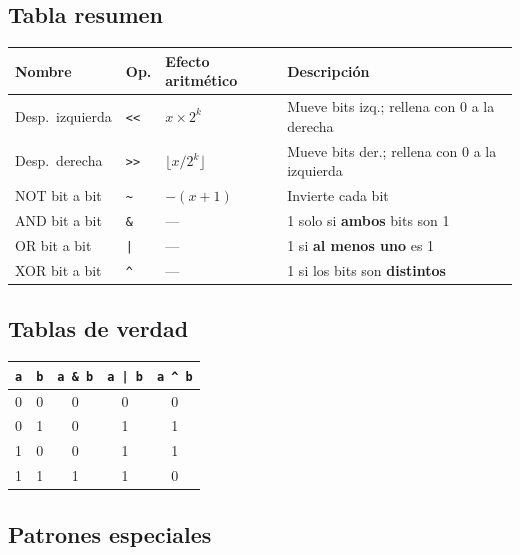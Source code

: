 \documentclass[12pt, oneside]{article}
\begin{document}
\subsection{Tabla resumen}

\begin{center}
\begin{tabular}{lllp{5.5cm}}
  \toprule
  \textbf{Nombre} & \textbf{Op.} & \textbf{Efecto aritmético} & \textbf{Descripción} \\
  \midrule
  Desp.\ izquierda & \texttt{<<} & $x \times 2^k$               & Mueve bits izq.; rellena con 0 a la derecha \\
  Desp.\ derecha   & \texttt{>>} & $\lfloor x / 2^k \rfloor$    & Mueve bits der.; rellena con 0 a la izquierda \\
  NOT bit a bit    & \texttt{\textasciitilde} & $-(x+1)$         & Invierte cada bit \\
  AND bit a bit    & \texttt{\&} & —                             & 1 solo si \textbf{ambos} bits son 1 \\
  OR bit a bit     & \texttt{|}  & —                             & 1 si \textbf{al menos uno} es 1 \\
  XOR bit a bit    & \texttt{\textasciicircum} & —               & 1 si los bits son \textbf{distintos} \\
  \bottomrule
\end{tabular}
\end{center}

\subsection{Tablas de verdad}

\begin{center}
\begin{tabular}{cc|c|c|c}
  \toprule
  \texttt{a} & \texttt{b} & \texttt{a \& b} & \texttt{a | b} & \texttt{a \textasciicircum{} b} \\
  \midrule
  0 & 0 & 0 & 0 & 0 \\
  0 & 1 & 0 & 1 & 1 \\
  1 & 0 & 0 & 1 & 1 \\
  1 & 1 & 1 & 1 & 0 \\
  \bottomrule
\end{tabular}
\end{center}

\subsection{Patrones especiales}
\end{document}
